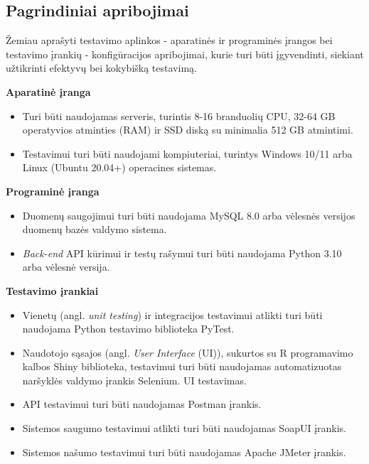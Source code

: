 \documentclass[12pt]{article}
\begin{document}
\newpage

\subsection{Pagrindiniai apribojimai}
Žemiau aprašyti testavimo aplinkos - aparatinės ir programinės įrangos bei
testavimo įrankių - konfigūracijos apribojimai, kurie turi būti įgyvendinti,
siekiant užtikrinti efektyvų bei kokybišką testavimą.

\vskip 10pt

\noindent \textbf{Aparatinė įranga}
\begin{itemize}
    \item Turi būti naudojamas serveris, turintis 8-16 branduolių CPU,
    32-64 GB operatyvios atminties (RAM) ir SSD diską su minimalia 512 GB
    atmintimi.
    \item Testavimui turi būti naudojami kompiuteriai, turintys Windows 10/11
    arba Linux (Ubuntu 20.04+) operacines sistemas.
\end{itemize}

\noindent \textbf{Programinė įranga}
\begin{itemize}
    \item Duomenų saugojimui turi būti naudojama MySQL 8.0 arba vėlesnės
    versijos duomenų bazės valdymo sistema.
    \item \emph{Back-end} API kūrimui ir testų rašymui turi būti naudojama
    Python 3.10 arba vėlesnė versija.
\end{itemize}

\noindent \textbf{Testavimo įrankiai}
\begin{itemize}
    \item Vienetų (angl. \emph{unit testing}) ir integracijos testavimui atlikti
    turi būti naudojama Python testavimo biblioteka PyTest.
    \item Naudotojo sąsajos (angl. \emph{User Interface} (UI)), sukurtos su R
    programavimo kalbos Shiny biblioteka, testavimui turi būti naudojamas
    automatizuotas naršyklės valdymo įrankis Selenium. UI testavimas.
    \item API testavimui turi būti naudojamas Postman įrankis.
    \item Sistemos saugumo testavimui atlikti turi būti naudojamas SoapUI
    įrankis.
    \item Sistemos našumo testavimui turi būti naudojamas Apache JMeter įrankis.
\end{itemize}

\newpage
\end{document}
